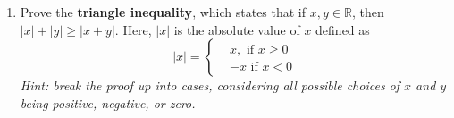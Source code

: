 \documentclass{article}
\begin{document}
\begin{enumerate}
\begin{mdframed}
\begin{enumerate}
\begin{align*}
& (1) \quad ~(p \wedge t) \rightarrow (r \vee s)\\
& (2) \quad ~q \rightarrow (u\wedge t)\\
& (3) \quad ~u \rightarrow  p\\
& (4) \quad ~\neg ~ s\\
& (5) \quad ~q\\
&\noindent\rule{4cm}{0.4pt}\\
& \therefore \quad ~ r
\end{align*}    

    And we check the argument as follows:

\begin{align*}
& (6) \quad ~(u\wedge t) \mbox{ from $(2), ~(5)$ using modus ponens.}\\
& (7) \quad ~u \mbox{ from $(6)$ using simplification.}\\
& (8) \quad ~p \mbox{ from $(3), ~(7)$ using modus ponens.}\\
& (9) \quad ~t \mbox{ from $(6)$ using simplification.}\\
& (10) \quad ~(p\wedge t) \mbox{ from $(8),~(9)$ using conjunction.}\\
& (11) \quad ~(r\vee s) \mbox{ from $(1),~(10)$ using modus ponens.}\\
& (12) \quad ~ r \mbox{ from $(4),~(11)$ using disjunctive syllogism.}\\
\end{align*}
\end{enumerate}
\end{mdframed}


    \item Prove the \textbf{triangle inequality}, which states that if $x, y \in \mathbb{R}$, then $|x| + |y| \geq |x + y|$. Here, $|x|$ is the absolute value of $x$ defined as
\[
|x|=\begin{cases}
& x, \mbox{ if $x\geq 0$}\\
& -x \mbox{ if $x< 0$}
\end{cases}
\]
\textit{Hint: break the proof up into cases, considering all possible choices of $x$ and $y$ being positive, negative, or zero.}
    

\end{enumerate}
\end{document}

